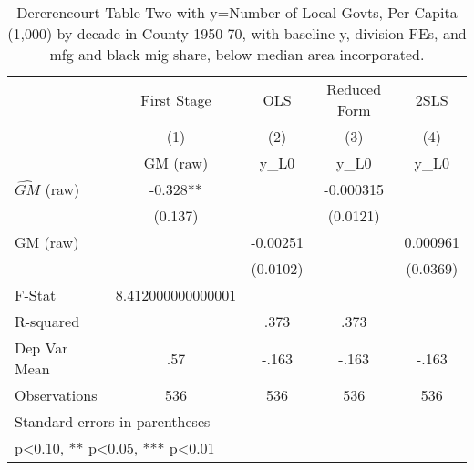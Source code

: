 \begin{table}[htbp]\centering
\def\sym#1{\ifmmode^{#1}\else\(^{#1}\)\fi}
\caption{Dererencourt Table Two with y=Number of Local Govts, Per Capita (1,000) by decade in County 1950-70, with baseline y, division FEs, and mfg and black mig share, below median area incorporated.}
\begin{tabular}{l*{4}{c}}
\toprule
                    & First Stage   &         OLS   &Reduced Form   &        2SLS   \\
                    &\multicolumn{1}{c}{(1)}&\multicolumn{1}{c}{(2)}&\multicolumn{1}{c}{(3)}&\multicolumn{1}{c}{(4)}\\
                    &\multicolumn{1}{c}{GM  (raw)}&\multicolumn{1}{c}{y\_L0}&\multicolumn{1}{c}{y\_L0}&\multicolumn{1}{c}{y\_L0}\\
\midrule
$\hat{GM}$ (raw)    &      -0.328** &               &   -0.000315   &               \\
                    &     (0.137)   &               &    (0.0121)   &               \\
\addlinespace
GM  (raw)           &               &    -0.00251   &               &    0.000961   \\
                    &               &    (0.0102)   &               &    (0.0369)   \\
\midrule
F-Stat              &8.412000000000001   &               &               &               \\
R-squared           &               &        .373   &        .373   &               \\
Dep Var Mean        &         .57   &       -.163   &       -.163   &       -.163   \\
Observations        &         536   &         536   &         536   &         536   \\
\bottomrule
\multicolumn{5}{l}{\footnotesize Standard errors in parentheses}\\
\multicolumn{5}{l}{\footnotesize * p<0.10, ** p<0.05, *** p<0.01}\\
\end{tabular}
\end{table}
